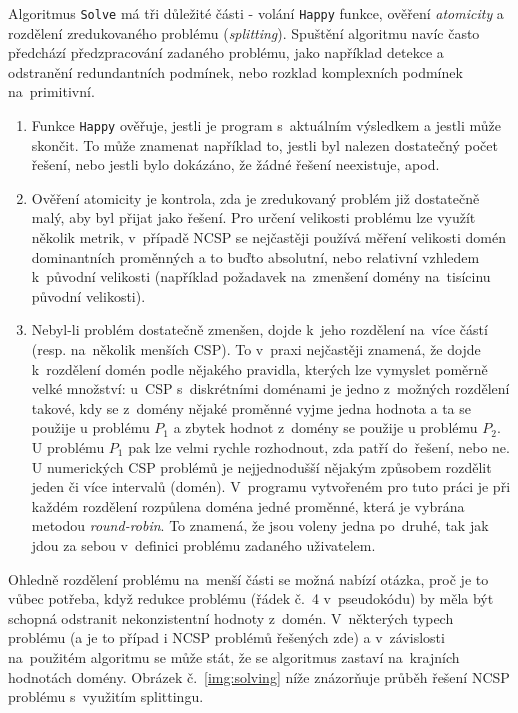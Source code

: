 Algoritmus \verb|Solve| má tři důležité části - volání \verb|Happy| funkce, ověření \emph{atomicity} a rozdělení zredukovaného problému (\emph{splitting}). Spuštění algoritmu navíc často předchází předzpracování zadaného problému, jako například detekce a odstranění redundantních podmínek, nebo rozklad komplexních podmínek na~primitivní.

\begin{enumerate}
    \item Funkce \verb|Happy| ověřuje, jestli je program  s~aktuálním výsledkem a jestli může skončit. To může znamenat například to, jestli byl nalezen dostatečný počet řešení, nebo jestli bylo dokázáno, že žádné řešení neexistuje, apod.
    \item Ověření atomicity je kontrola, zda je zredukovaný problém již dostatečně malý, aby byl přijat jako řešení. Pro určení velikosti problému lze využít několik metrik, v~případě NCSP se nejčastěji používá měření velikosti domén dominantních proměnných a to buďto absolutní, nebo relativní vzhledem k~původní velikosti (například požadavek na~zmenšení domény na~tisícinu původní velikosti).
    \item Nebyl-li problém dostatečně zmenšen, dojde k~jeho rozdělení na~více částí (resp. na~několik menších CSP). To v~praxi nejčastěji znamená, že dojde k~rozdělení domén podle nějakého pravidla, kterých lze vymyslet poměrně velké množství: u~CSP s~diskrétními doménami je jedno z~možných rozdělení takové, kdy se z~domény nějaké proměnné vyjme jedna hodnota a ta se použije u problému $P_1$ a zbytek hodnot z~domény se použije u problému $P_2$. U problému $P_1$ pak lze velmi rychle rozhodnout, zda patří do~řešení, nebo ne. U numerických CSP problémů je nejjednodušší nějakým způsobem rozdělit jeden či více intervalů (domén). V~programu vytvořeném pro tuto práci je při každém rozdělení rozpůlena doména jedné proměnné, která je vybrána metodou \emph{round-robin}. To znamená, že jsou voleny jedna po~druhé, tak jak jdou za sebou v~definici problému zadaného uživatelem.
\end{enumerate}

Ohledně rozdělení problému na~menší části se možná nabízí otázka, proč je to vůbec potřeba, když redukce problému (řádek č.~4 v~pseudokódu) by měla být schopná odstranit nekonzistentní hodnoty z~domén. V~některých typech problému (a je to případ i NCSP problémů řešených zde) a v~závislosti na~použitém algoritmu se může stát, že se algoritmus zastaví na~krajních hodnotách domény. Obrázek č.~\ref{img:solving} níže znázorňuje průběh řešení NCSP problému s~využitím splittingu.

